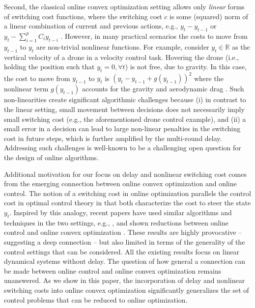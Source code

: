 Second, the classical online convex optimization setting allows only \emph{linear} forms of switching cost functions, where the switching cost $c$ is some (squared) norm of a linear combination of current and previous actions, e.g.,  $y_t-y_{t-1}$ \cite{goel2019beyond, goel2019online, chen2018smoothed} or $y_t-\sum_{i=1}^pC_iy_{t-i}$ \cite{shi2020online}. However, in many practical scenarios the costs to move from $y_{t-1}$ to $y_t$ are non-trivial nonlinear functions. For example, consider $y_t\in\mathbb{R}$ as the vertical velocity of a drone in a velocity control task. Hovering the drone (i.e., holding the position such that $y_t=0,\forall t$) is not free, due to gravity. In this case, the cost to move from $y_{t-1}$ to $y_t$ is $(y_t-y_{t-1}+g(y_{t-1}))^2$ where the nonlinear term $g(y_{t-1})$ accounts for the gravity and aerodynamic drag \cite{shi2019neural}. 
Such non-linearities create significant algorithmic challenges because (i) in contrast to the linear setting, small movement between decisions does not necessarily imply small switching cost (e.g., the aforementioned drone control example), and (ii) a small error in a decision can lead to large non-linear penalties in the switching cost in future steps, which is further amplified by the multi-round delay. Addressing such challenges is well-known to be a challenging open question for the design of online algorithms. 

Additional motivation for our focus on delay and nonlinear switching cost comes from the emerging connection between online convex optimization and online control. The notion of a switching cost in online optimization parallels the control cost in optimal control theory in that both characterize the cost to steer the state $y_t$. Inspired by this analogy, recent papers have used similar algorithms and techniques in the two settings, e.g., \citep{agarwal2019online,li2020online}, and shown reductions between online control and online convex optimization \citep{goel2019online,li2019online,shi2020online,agarwal2019online,simchowitz2020improper,shi2021meta,yu2020power}. These results are highly provocative -- suggesting a deep connection -- but also limited in terms of the generality of the control settings that can be considered. All the existing results focus on linear dynamical systems without delay. The question of how general a connection can be made between online control and online convex optimization remains unanswered.  As we show in this paper, the incorporation of delay and nonlinear switching costs into online convex optimization significantly generalizes the set of control problems that can be reduced to online optimization. 


